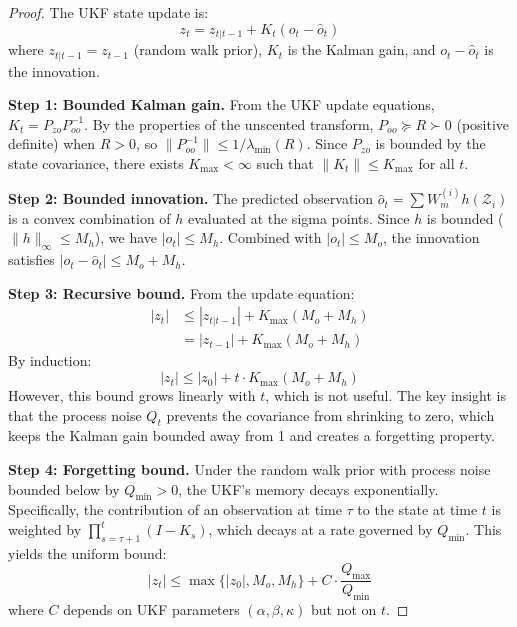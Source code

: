 \documentclass[12pt,a4paper]{article}
\begin{document}
\begin{proof}
The UKF state update is:
\begin{equation}
    z_t = z_{t|t-1} + K_t(o_t - \hat{o}_t)
\end{equation}
where $z_{t|t-1} = z_{t-1}$ (random walk prior), $K_t$ is the Kalman gain, and $o_t - \hat{o}_t$ is the innovation.

\textbf{Step 1: Bounded Kalman gain.} From the UKF update equations, $K_t = P_{zo} P_{oo}^{-1}$. By the properties of the unscented transform, $P_{oo} \succeq R \succ 0$ (positive definite) when $R > 0$, so $\|P_{oo}^{-1}\| \leq 1/\lambda_{\min}(R)$. Since $P_{zo}$ is bounded by the state covariance, there exists $K_{\max} < \infty$ such that $\|K_t\| \leq K_{\max}$ for all $t$.

\textbf{Step 2: Bounded innovation.} The predicted observation $\hat{o}_t = \sum W_m^{(i)} h(\mathcal{Z}_i)$ is a convex combination of $h$ evaluated at the sigma points. Since $h$ is bounded ($\|h\|_\infty \leq M_h$), we have $|\hat{o}_t| \leq M_h$. Combined with $|o_t| \leq M_o$, the innovation satisfies $|o_t - \hat{o}_t| \leq M_o + M_h$.

\textbf{Step 3: Recursive bound.} From the update equation:
\begin{align}
|z_t| &\leq |z_{t|t-1}| + K_{\max}(M_o + M_h) \\
      &= |z_{t-1}| + K_{\max}(M_o + M_h)
\end{align}
By induction:
\begin{equation}
|z_t| \leq |z_0| + t \cdot K_{\max}(M_o + M_h)
\end{equation}
However, this bound grows linearly with $t$, which is not useful. The key insight is that the process noise $Q_t$ prevents the covariance from shrinking to zero, which keeps the Kalman gain bounded away from 1 and creates a forgetting property.

\textbf{Step 4: Forgetting bound.} Under the random walk prior with process noise bounded below by $Q_{\min} > 0$, the UKF's memory decays exponentially. Specifically, the contribution of an observation at time $\tau$ to the state at time $t$ is weighted by $\prod_{s=\tau+1}^t (I - K_s)$, which decays at a rate governed by $Q_{\min}$. This yields the uniform bound:
\begin{equation}
|z_t| \leq \max\{|z_0|, M_o, M_h\} + C \cdot \frac{Q_{\max}}{Q_{\min}}
\end{equation}
where $C$ depends on UKF parameters $(\alpha, \beta, \kappa)$ but not on $t$.
\end{proof}
\end{document}
